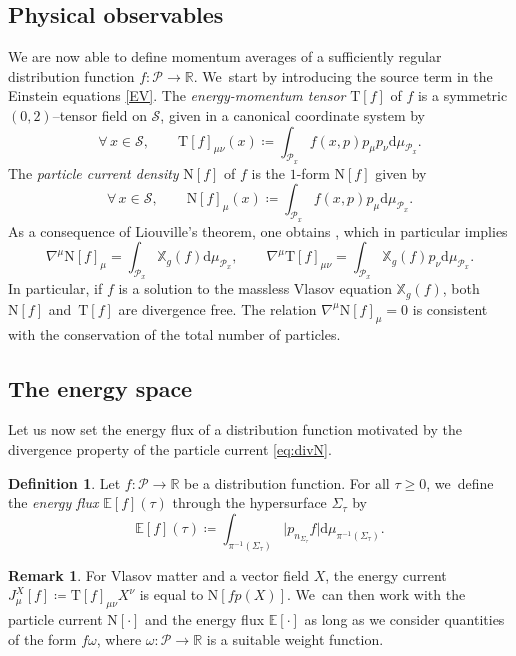 \documentclass[JEP,XML,SOM,Unicode,published]{cedram}
\theoremstyle{plain}
\theoremstyle{definition}
\newtheorem{definition}[proposition]{Definition}
\newtheorem{remark}[proposition]{Remark}
\newcommand\R{{\mathbb{R}}}
\newcommand\T{{\mathbb{X}}}
\newcommand\dr{{\mathrm{d}}}
\begin{document}
\subsection{Physical observables}

We are now able to define momentum averages of a sufficiently regular distribution function $f \colon \mathcal{P} \to \R$. We~start by introducing the source term in the Einstein equations \eqref{EV}. The \emph{energy-momentum tensor} $\mathrm{T}[f]$ of $f$ is a symmetric $(0,2)$--tensor field on $\mathcal{S}$, given in a canonical coordinate system by
\[
\forall \, x \in \mathcal{S},\qquad \mathrm{T}[f]_{\mu\nu}(x) \coloneqq \int_{\mathcal{P}_x} f(x,p) p_{\mu} p_{\nu} \dr \mu_{\mathcal{P}_x}.
\]
The \emph{particle current density} $\mathrm{N}[f]$ of $f$ is the $1$-form $\mathrm{N}[f]$ given by
\[
\forall \, x \in \mathcal{S},\qquad \mathrm{N}[f]_{\mu}(x) \coloneqq \int_{\mathcal{P}_x} f(x,p) p_{\mu} \dr \mu_{\mathcal{P}_x}.
\]
As a consequence of Liouville's theorem, one obtains \cite[Th.\,3]{AGS}, which in particular implies
\begin{equation}\label{eq:divN}
\nabla^{\mu}\mathrm{N}[f]_\mu =\int_{\mathcal{P}_x} \T_g(f) \dr \mu_{\mathcal{P}_x},\qquad \nabla^{\mu}\mathrm{T}[f]_{\mu\nu} = \int_{\mathcal{P}_x}\T_g(f)p_{\nu}\dr \mu_{\mathcal{P}_x}.
\end{equation}
In particular, if $f$ is a solution to the massless Vlasov equation $\T_g(f)$, both~$\mathrm{N}[f]$ and~$\mathrm{T}[f]$ are divergence free. The relation $\nabla^\mu \mathrm{N}[f]_\mu =0$ is consistent with the conservation of the total number of particles.

\subsection{The energy space}\label{subsect_energy_space}

Let us now set the energy flux of a distribution function motivated by the divergence property of the particle current \eqref{eq:divN}.

\begin{definition}
Let $f \colon \mathcal{P} \to \R$ be a distribution function. For all $\tau \geq 0$, we~define the \emph{energy flux} $\mathbb{E} [f](\tau)$ through the hypersurface $\Sigma_\tau$ by
\[
\mathbb{E} [f](\tau) \coloneqq \int_{\pi^{-1}(\Sigma_\tau)} \big| p_{n_{\Sigma_\tau}} f \big| \dr \mu_{\pi^{-1}(\Sigma_\tau)}.
\]
\end{definition}
\begin{remark}
For Vlasov matter and a vector field $X$, the energy current $J_{\mu}^X[f]\coloneqq \mathrm{T}[f]_{\mu \nu} X^{\nu}$ is equal to $\mathrm{N}[fp(X)]$. We~can then work with the particle current $\mathrm{N}[\cdot ]$ and the energy flux $\mathbb{E} [\cdot]$ as long as we consider quantities of the form $f\omega$, where $\omega \colon \mathcal{P}\to \R$ is a suitable weight function.
\end{remark}
\end{document}
